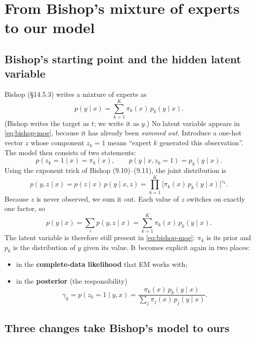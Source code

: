 \section{From Bishop's mixture of experts to our model}

\subsection{Bishop's starting point and the hidden latent variable}

Bishop (\S14.5.3) writes a mixture of experts as
\begin{equation}\label{eq:bishop-moe}
p(y\mid x) = \sum_{k=1}^{K} \pi_k(x)\, p_k(y\mid x).
\end{equation}
(Bishop writes the target as $t$; we write it as $y$.) No latent variable appears in \eqref{eq:bishop-moe}, because it has already been \emph{summed out}. Introduce a one-hot vector $z$ whose component $z_k=1$ means ``expert $k$ generated this observation''. The model then consists of two statements:
\begin{equation}
p(z_k=1\mid x)=\pi_k(x), \qquad p(y\mid x, z_k=1) = p_k(y\mid x).
\end{equation}
Using the exponent trick of Bishop (9.10)--(9.11), the joint distribution is
\begin{equation}
p(y,z\mid x) = p(z\mid x)\,p(y\mid x,z) = \prod_{k=1}^K \big[\pi_k(x)\,p_k(y\mid x)\big]^{z_k}.
\end{equation}
Because $z$ is never observed, we sum it out. Each value of $z$ switches on exactly one factor, so
\begin{equation}
p(y\mid x)=\sum_z p(y,z\mid x)=\sum_{k=1}^K \pi_k(x)\,p_k(y\mid x).
\end{equation}
The latent variable is therefore still present in \eqref{eq:bishop-moe}: $\pi_k$ is its prior and $p_k$ is the distribution of $y$ given its value. It becomes explicit again in two places:
\begin{itemize}
  \item in the \textbf{complete-data likelihood} that EM works with;
  \item in the \textbf{posterior} (the responsibility)
  \begin{equation}
  \gamma_k = p(z_k=1\mid y,x)=\frac{\pi_k(x)\,p_k(y\mid x)}{\sum_j \pi_j(x)\,p_j(y\mid x)}.
  \end{equation}
\end{itemize}

\subsection{Three changes take Bishop's model to ours}

